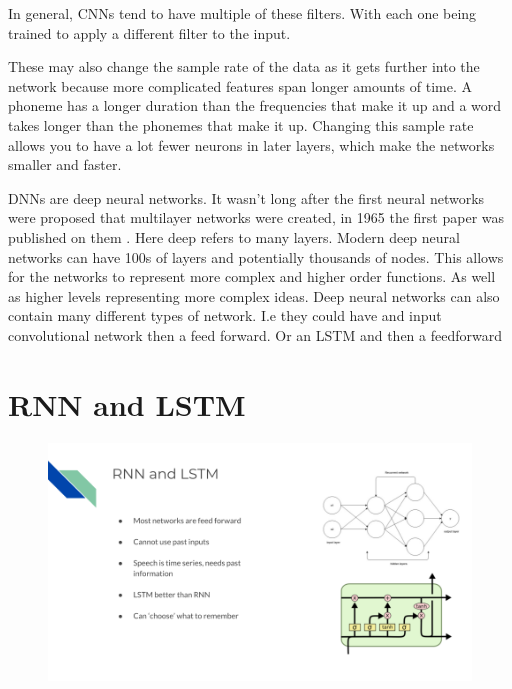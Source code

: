 \documentclass[10pt]{article}
\begin{document}
         In general, CNNs tend to have multiple of these filters. With each one being trained to apply a different filter to the input. 
        
        These may also change the sample rate of the data as it gets further into the network because more complicated features span longer amounts of time. A phoneme has a longer duration than the frequencies that make it up and a word takes longer than the phonemes that make it up. Changing this sample rate allows you to have a lot fewer neurons in later layers, which make the networks smaller and faster.
                        
        
        DNNs are deep neural networks. 
        It wasn't long after the first neural networks were proposed that multilayer networks were created, in 1965 the first paper was published on them \cite{ivakhnenko1965cybernetic}.  Here deep refers to many layers.
        Modern deep neural networks can have 100s of layers and potentially thousands of nodes. This allows for the networks to represent more complex and higher order functions. As well as higher levels representing more complex ideas.
        Deep neural networks can also contain many different types of network. I.e they could have and input convolutional network then a feed forward. Or an LSTM and then a feedforward

        \newpage

    \section*{RNN and LSTM}
	    
	    \begin{figure}[H]
            \centering
            \includegraphics[width=1\textwidth]{slide_4}
            \label{fig:appendix:slide_4}
        \end{figure}
\end{document}
